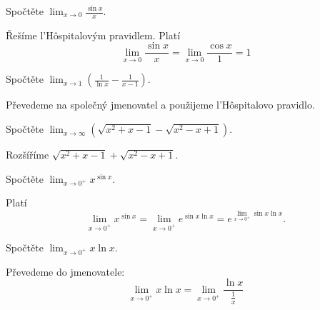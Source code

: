 \begin{priklad}
  Spočtěte $\lim_{x\to 0}\frac{\sin x}{x}.$
\end{priklad}

\begin{reseni}
  Řešíme l'H\^ospitalovým pravidlem.
  Platí
  $$\lim_{x\to 0}\frac{\sin x}{x}=\lim_{x\to 0}\frac{\cos x}{1}=1$$
\end{reseni}


\begin{priklad}
Spočtěte $\lim_{x\to 1} \left ( \frac{1}{\ln x}-\frac{1}{x-1} \right ) $.
\end{priklad}

\begin{reseni}
Převedeme na společný jmenovatel a použijeme l'H\^{o}spitalovo pravidlo.
\end{reseni}

\begin{priklad}
Spočtěte $\lim_{x\to \infty}\left ( \sqrt{x^2+x-1}-\sqrt{x^2-x+1}   \right ) $.
\end{priklad}

\begin{reseni}
Rozšíříme $\sqrt{x^2+x-1}+\sqrt{x^2-x+1}$.
\end{reseni}

\begin{priklad}
Spočtěte $\lim_{x\to 0^+}x^{\sin x}.$
\end{priklad}

\begin{reseni}
Platí
$$\lim_{x\to 0^+}x^{\sin x}=\lim_{x\to 0^+}e^{\sin x\ln x}=e^{\lim_{x\to 0^+}\sin x\ln x}.$$
\end{reseni}

\begin{priklad}
  Spočtěte $\lim_{x\to 0^+}x\ln x.$
\end{priklad}

\begin{reseni}
  Převedeme do jmenovatele:
  $$\lim_{x\to 0^+}x\ln x=\lim_{x\to 0^+}\frac{\ln x}{\frac{1}{x}}$$
\end{reseni}
